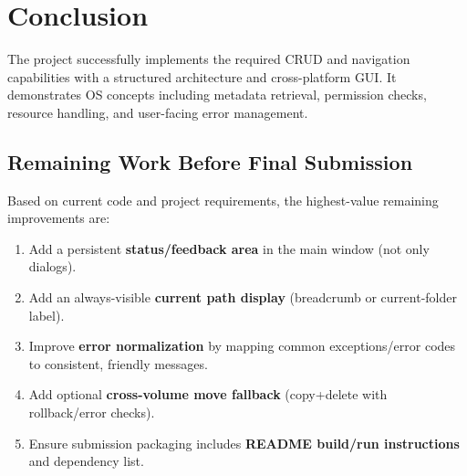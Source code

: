 \documentclass[11pt]{article}
\begin{document}
\section{Conclusion}
The project successfully implements the required CRUD and navigation capabilities with a structured architecture and cross-platform GUI. It demonstrates OS concepts including metadata retrieval, permission checks, resource handling, and user-facing error management.

\subsection*{Remaining Work Before Final Submission}
Based on current code and project requirements, the highest-value remaining improvements are:
\begin{enumerate}
  \item Add a persistent \textbf{status/feedback area} in the main window (not only dialogs).
  \item Add an always-visible \textbf{current path display} (breadcrumb or current-folder label).
  \item Improve \textbf{error normalization} by mapping common exceptions/error codes to consistent, friendly messages.
  \item Add optional \textbf{cross-volume move fallback} (copy+delete with rollback/error checks).
  \item Ensure submission packaging includes \textbf{README build/run instructions} and dependency list.
\end{enumerate}
\end{document}
